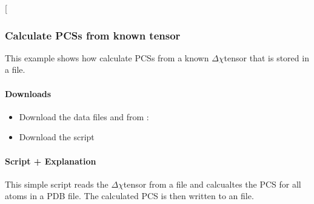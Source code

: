 \documentclass[a4paper,10pt,english,openany,oneside]{sphinxmanual}
\begin{document}
\sphinxAtStartPar
{} {[}\sphinxcode{\sphinxupquote{pcs\_fit.png}}{]}

\noindent{}


\subsubsection{Calculate PCSs from known tensor}
\label{\detokenize{examples/pcs_calc:calculate-pcss-from-known-tensor}}\label{\detokenize{examples/pcs_calc:pcs-calc}}\label{\detokenize{examples/pcs_calc::doc}}
\sphinxAtStartPar
This example shows how calculate PCSs from a known \({\Delta\chi}\)\sphinxhyphen{}tensor that is stored in a file.


\paragraph{Downloads}
\label{\detokenize{examples/pcs_calc:downloads}}\begin{itemize}
\item {} 
\sphinxAtStartPar
Download the data files  and  from :

\item {} 
\sphinxAtStartPar
Download the script 

\end{itemize}


\paragraph{Script + Explanation}
\label{\detokenize{examples/pcs_calc:script-explanation}}
\sphinxAtStartPar
This simple script reads the \({\Delta\chi}\)\sphinxhyphen{}tensor from a file and calcualtes the PCS for all atoms in a PDB file. The calculated PCS is then written to an  file.
\end{document}
